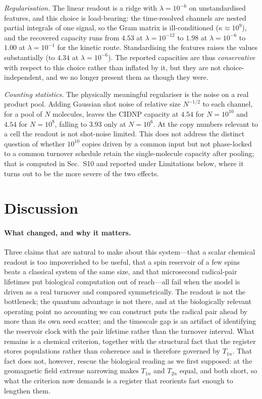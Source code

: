 \documentclass[aps,prx,reprint,superscriptaddress,nofootinbib,floatfix]{revtex4-2}
\begin{document}
\emph{Regularisation.} The linear readout is a ridge with $\lambda=10^{-6}$ on
unstandardised features, and this choice is load-bearing: the time-resolved
channels are nested partial integrals of one signal, so the Gram matrix is
ill-conditioned ($\kappa\approx10^{9}$), and the recovered capacity runs from
$4.53$ at $\lambda=10^{-12}$ to $1.98$ at $\lambda=10^{-6}$ to $1.00$ at
$\lambda=10^{-1}$ for the kinetic route. Standardising the features raises the
values substantially (to $4.34$ at $\lambda=10^{-6}$). The reported capacities are
thus \emph{conservative} with respect to this choice rather than inflated by it,
but they are not choice-independent, and we no longer present them as though they
were.

\emph{Counting statistics.} The physically meaningful regulariser is the noise on
a real product pool. Adding Gaussian shot noise of relative size $N^{-1/2}$ to
each channel, for a pool of $N$ molecules, leaves the CIDNP capacity at $4.54$ for
$N=10^{10}$ and $4.54$ for $N=10^{8}$, falling to $3.93$ only at $N=10^{6}$. At
the copy numbers relevant to a cell the readout is not shot-noise limited. This
does not address the distinct question of whether $10^{10}$ copies driven by a
common input but not phase-locked to a common turnover schedule retain the
single-molecule capacity after pooling; that is computed in
Sec.~S10 and reported under Limitations below, where it turns out to be the more
severe of the two effects.

\section{Discussion}\label{sec:discussion}

\paragraph*{What changed, and why it matters.}
Three claims that are natural to make about this system---that a scalar chemical
readout is too impoverished to be useful, that a spin reservoir of a few spins beats
a classical system of the same size, and that microsecond radical-pair lifetimes put
biological computation out of reach---all fail when the model is driven as a real
turnover and compared symmetrically. The readout is not the bottleneck; the quantum
advantage is not there, and at the biologically relevant operating point no
accounting we can construct puts the radical pair ahead by more than its own seed
scatter; and the timescale gap is an
artifact of identifying the reservoir clock with the pair lifetime rather than the
turnover interval. What remains is a chemical criterion, together with the
structural fact that the register stores populations rather than coherence and is
therefore governed by $T_{1n}$. That fact does not, however, rescue the biological
reading as we first supposed: at the geomagnetic field extreme narrowing makes
$T_{1n}$ and $T_{2n}$ equal, and both short, so what the criterion now demands is
a register that reorients fast enough to lengthen them.
\end{document}
